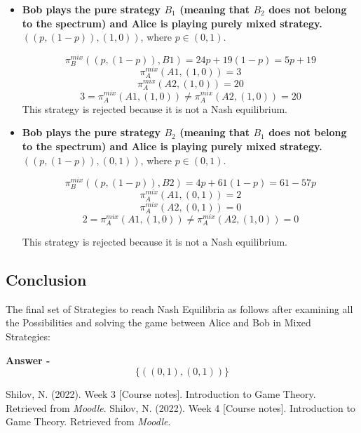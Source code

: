 \documentclass{article}
\begin{document}
\begin{itemize}
    \item \textbf{Bob plays the pure strategy $B_1$ (meaning that $B_2$ does not belong to the spectrum) and Alice is playing  purely mixed strategy.} $( (p, (1 - p) ), (1, 0 ) )$, where $p \in (0, 1)$.

$$\pi^{mix}_B ( (p, (1 - p) ), B1 ) = 24p + 19(1 - p) = 5p + 19$$
$$\pi^{mix}_A ( A1, (1, 0) ) =  3$$ 
$$\pi^{mix}_A ( A2, (1, 0) ) =  20$$
$$3 = \pi^{mix}_A( A1, (1, 0) ) \neq \pi^{mix}_A ( A2, (1, 0) ) =  20$$
This strategy is rejected because it is not a Nash equilibrium.
    
    \item 
\textbf{Bob plays the pure strategy $B_2$ (meaning that $B_1$ does not belong to the spectrum) and Alice is playing  purely mixed strategy.} $( (p, (1 - p) ), (0, 1 ) )$, where $p \in (0, 1)$.

$$\pi^{mix}_B ( (p, (1 - p) ), B2 ) = 4p + 61(1 - p) = 61 - 57p$$
$$\pi^{mix}_A ( A1, (0, 1) ) =  2$$ 
$$\pi^{mix}_A ( A2, (0, 1) ) =  0$$
$$2 = \pi^{mix}_A( A1, (1, 0) ) \neq \pi^{mix}_A ( A2, (1, 0) ) =  0$$

This strategy is rejected because it is not a Nash equilibrium.
\end{itemize}

\subsection{Conclusion}
The final set of Strategies to reach Nash Equilibria as follows after examining all the Possibilities and solving the game between Alice and Bob in Mixed Strategies:

\textbf{Answer - }
$$
 \{( (0, 1 ), (0, 1 ) )\}
$$
\begin{thebibliography}{00}
 Shilov, N. (2022). Week 3 [Course notes]. Introduction to Game Theory. Retrieved from
\textit{Moodle}.
 Shilov, N. (2022). Week 4 [Course notes]. Introduction to Game Theory. Retrieved from
\textit{Moodle}.
\end{thebibliography}
\end{document}
